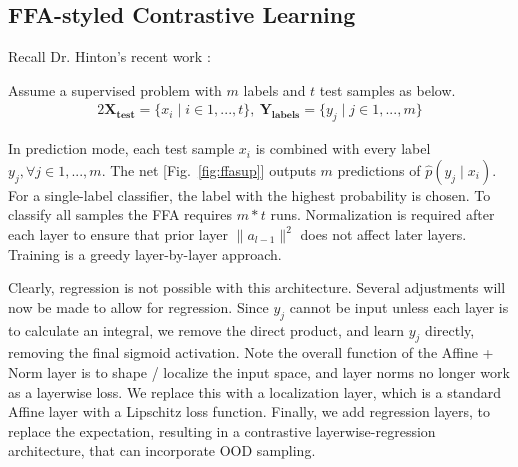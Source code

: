 \documentclass[12pt]{iopart}
\theoremstyle{break}
\begin{document}
\subsection{FFA-styled Contrastive Learning}
Recall Dr. Hinton's recent work \cite{FFA23}:
\begin{description}\item
Assume a supervised problem with $m$ labels and $t$ test samples as below.
\begin{alignat}{2}
\mathbf{X_{test}} = \{x_i \mid i \in 1,...,t \},\ \mathbf{Y_{labels}} = \{y_j \mid j \in 1,...,m \}
\end{alignat}

\begin{figure}[htpb]
\centering


\end{figure}

In prediction mode, each test sample $x_i$ is combined with every label $y_j, \forall j\in 1,...,m$. The net [Fig.~\ref{fig:ffasup}] outputs $m$ predictions of $\hat{p}(y_j \mid x_i)$.
For a single-label classifier, the label with the highest probability is chosen.
To classify all samples the FFA requires $m*t$ runs.
Normalization is required after each layer to ensure that prior layer $\|a_{l-1}\|^2$ does not affect later layers.
Training is a greedy layer-by-layer approach.
\end{description}
Clearly, regression is not possible with this architecture. Several adjustments will now be made to allow for regression.
Since $y_j$ cannot be input unless each layer is to calculate an integral, we remove the direct product, and learn $y_j$ directly, removing the final sigmoid activation.
Note the overall function of the Affine + Norm layer is to shape / localize the input space, and layer norms no longer work as a layerwise loss. 
We replace this with a localization layer, which is a standard Affine layer with a Lipschitz loss function.
Finally, we add regression layers, to replace the expectation, resulting in a contrastive layerwise-regression architecture, that can incorporate OOD sampling.
\end{document}
